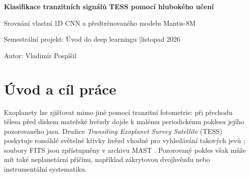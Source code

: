 \documentclass[11pt,a4paper]{article}
\begin{document}
\begin{center}
  {\Large\bfseries\sffamily Klasifikace tranzitních signálů TESS pomocí hlubokého učení}\par
  \vspace{2.5mm}
  {\normalsize Srovnání vlastní 1D CNN a předtrénovaného modelu Mantis-8M}\par
  \vspace{2.0mm}
  {\small Semestrální projekt: Úvod do deep learningu \quad|\quad listopad 2026}\par
  {\small Autor: Vladimír Pospíšil}\par
\end{center}
\vspace{-1.5mm}
\begin{abstract}
\noindent
Práce zkoumá binární klasifikaci již katalogově označených tranzitních signálů z fotometrických měření družice TESS. Porovnává logistickou regresi, vlastní dvouvětvovou jednorozměrnou konvoluční síť (CNN) a předtrénovaný encoder Mantis-8M se samostatně učenou klasifikační hlavou. Z~13\,254 katalogových záznamů bylo vybráno 1\,918 použitelných signálů se štítkem potvrzená planeta nebo falešně pozitivní signál. Hvězdy byly rozděleny podle identifikátoru TIC tak, aby se nevyskytovaly v~různých množinách. Na jednorázově vyhodnoceném nezávislém testu 290 signálů dosáhly modely v metrice \emph{Average Precision} (AP) 0,7981, 0,8851\,$\pm$\,0,0049 a 0,9009\,$\pm$\,0,0024. Doplňková pětinásobná skupinová CV nad vývojovými daty podpořila vyšší průměrnou AP modelu Mantis; přínos masky pokrytí se nepotvrdil. Výsledky podporují použitelnost přenosu reprezentací z předtrénovaného modelu, ale nevypovídají o spolehlivosti potvrzování dosud neznámých exoplanet.
\end{abstract}

\section{Úvod a cíl práce}
Exoplanety lze zjišťovat mimo jiné pomocí tranzitní fotometrie: při přechodu tělesa před diskem mateřské hvězdy dojde k malému periodickému poklesu jejího pozorovaného jasu. Družice \emph{Transiting Exoplanet Survey Satellite} (TESS) poskytuje rozsáhlé světelné křivky hvězd vhodné pro vyhledávání takových jevů \cite{ricker2015}; soubory FITS jsou zpřístupněny v archivu MAST \cite{mast}. Pozorovaný pokles však může mít také neplanetární příčinu, například zákrytovou dvojhvězdu nebo instrumentální systematiku.
\end{document}
